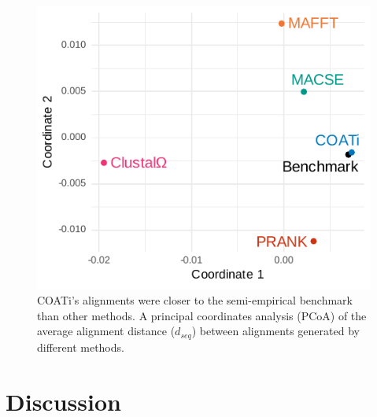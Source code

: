 \documentclass[12pt,letterpaper]{article}
\begin{document}
\begin{figure}[h!]
    \centering%
    \includegraphics{figures/fig-dseq-benchmarks.pdf}
    \par
    \caption{COATi's alignments were closer to the semi-empirical benchmark than other methods. A principal coordinates analysis (PCoA) of the average alignment distance ($d_{seq}$) between alignments generated by different methods.
%
    \label{fig:dseq-benchmarks}}
\end{figure}

\clearpage

\section*{Discussion}
\end{document}

